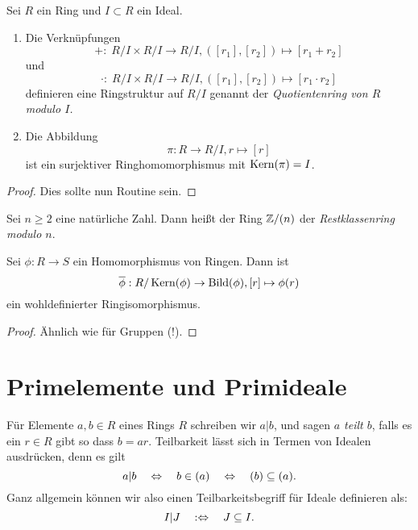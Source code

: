 \documentclass{book}
\begin{document}
\begin{prop}
    \label{prop:quot} Sei $R$ ein Ring und $I \subset R$ ein Ideal.
    \begin{enumerate}
        \item Die Verknüpfungen 
            \[
                +: \; R/I \times R/I \to R/I, ([r_1],[r_2]) \mapsto [r_1+r_2]
            \]
            und
            \[
                \cdot: \; R/I \times R/I \to R/I, ([r_1],[r_2]) \mapsto [r_1 \cdot r_2]
            \]
            definieren eine Ringstruktur auf $R/I$ genannt der \emph{Quotientenring von
            $R$ modulo $I$.} 
        \item Die Abbildung 
            \[
                \pi: R \to R/I, r \mapsto [r]
            \]
            ist ein surjektiver Ringhomomorphismus mit $\operatorname{Kern}(\pi) = I$. 
    \end{enumerate}
\end{prop}
\begin{proof}
   Dies sollte nun Routine sein. 
\end{proof}

\begin{exa}
    \label{exa:restklassen}
    Sei $n \ge 2$ eine natürliche Zahl. Dann heißt der Ring $\mathbb{Z}/(n)$ der
    \emph{Restklassenring modulo $n$}.
\end{exa}


\begin{thm}
    \label{thm:haupthom}
    Sei $\phi: R \to S$ ein Homomorphismus von Ringen. Dann ist 
    \[
        \overline{\phi}: R/\Kern(\phi) \to \Bild(\phi), [r] \mapsto \phi(r)
    \]
    ein wohldefinierter Ringisomorphismus.
\end{thm}
\begin{proof}
    Ähnlich wie für Gruppen (!).
\end{proof}

\section{Primelemente und Primideale}%
\label{sec:primideale}

Für Elemente $a,b \in R$ eines Rings $R$ schreiben wir $a|b$, und sagen {\em
$a$ teilt $b$}, falls es ein $r \in R$ gibt so dass $b = a r$. Teilbarkeit
lässt sich in Termen von Idealen ausdrücken, denn es gilt
\[
    a | b \quad \Leftrightarrow \quad b \in (a) \quad \Leftrightarrow \quad (b) \subseteq (a).
\]
Ganz allgemein können wir also einen Teilbarkeitsbegriff für Ideale definieren als:
\[
    I | J \quad : \Leftrightarrow \quad J \subseteq I.
\]
\end{document}
